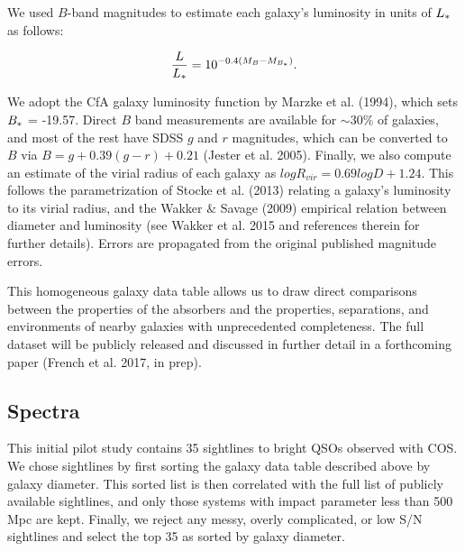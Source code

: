 \documentclass[iop]{emulateapj-rtx4}
\begin{document}
We used $B$-band magnitudes to estimate each galaxy's luminosity in units of $L_{\**}$ as follows:

\begin{equation}
	\frac{L}{L_{\**}} = 10^{-0.4 (M_{B} - M_{B_{\**}})}.
\end{equation}

We adopt the CfA galaxy luminosity function by Marzke et al. (1994), which sets $B_{\**} $ = -19.57. Direct $B$ band measurements are available for $\sim 30\%$ of galaxies, and most of the rest have SDSS $g$ and $r$ magnitudes, which can be converted to $B$ via $B = g + 0.39 (g-r) + 0.21$ (Jester et al. 2005). Finally, we also compute an estimate of the virial radius of each galaxy as $log R_{vir} = 0.69 log D + 1.24$. This follows the parametrization of Stocke et al. (2013) relating a galaxy's luminosity to its virial radius, and the Wakker $\&$ Savage (2009) empirical relation between diameter and luminosity (see Wakker et al. 2015 and references therein for further details). Errors are propagated from the original published magnitude errors.

This homogeneous galaxy data table allows us to draw direct comparisons between the properties of the absorbers and the properties, separations, and environments of nearby galaxies with unprecedented completeness. The full dataset will be publicly released and discussed in further detail in a forthcoming paper (French et al. 2017, in prep).


\subsection{Spectra}

This initial pilot study contains 35 sightlines to bright QSOs observed with COS. We chose sightlines by first sorting the galaxy data table described above by galaxy diameter. This sorted list is then correlated with the full list of publicly available sightlines, and only those systems with impact parameter less than 500 Mpc are kept. Finally, we reject any messy, overly complicated, or low S/N sightlines and select the top 35 as sorted by galaxy diameter.

\end{document}
